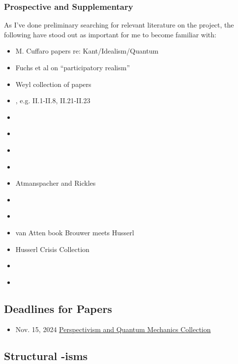 \subsubsection{Prospective and Supplementary}

As I've done preliminary searching for relevant literature on the project, the following have stood out as important for me to become familiar with:

\begin{itemize}
    \item M. Cuffaro papers re: Kant/Idealism/Quantum
    \item Fuchs et al on ``participatory realism''
    \item Weyl collection of papers
    \item \cite{SchilppCassirer}, e.g. II.1-II.8, II.21-II.23
    \item \cite{Adorno1940}
    \item \cite{Clifford1878}
    \item \cite{Ewing1934}
    \item \cite{Kilmister1994}
    \item Atmanspacher and Rickles
    \item \cite{Cartwright1983}
    \item \cite{Torretti1999}
    \item van Atten book Brouwer meets Husserl
    \item Husserl Crisis Collection
    \item \cite{Zahar2001}
    \item \cite{Zahar2007}



\end{itemize}




\subsection{Deadlines for Papers}

\begin{itemize}
    \item Nov. 15, 2024 \href{https://link.springer.com/collections/cabhjbifbf}{Perspectivism and Quantum Mechanics Collection}
\end{itemize}




\subsection{Structural -isms}


